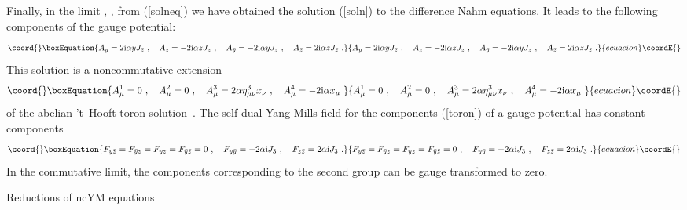 \documentclass[a4paper,11pt]{article}
\makeatletter
\renewcommand{\section}{\@startsection{section}{1}{0pt}{\medskipamount}
{\medskipamount}{\large\bf}}
\numberwithin{equation}{section}
\def\a{\alpha}
\def\b{\beta}
\def\m{\mu}
\def\n{\nu}
\providecommand{\im}{\mathrm{i}}
\providecommand{\zb}{{\bar{z}}}
\providecommand{\yb}{{\bar{y}}}
\makeatother
\begin{document}
Finally, in  the limit \myHighlight{$\b\to\infty$}\coordHE{}, \myHighlight{$\a = const$}\coordHE{}, from 
(\ref{solneq}) we have obtained the solution (\ref{soln}) to the 
difference Nahm equations. It leads to the following components of the
gauge potential: 
\begin{equation}\coord{}\boxEquation{
A_y = 2\im\a \yb  J_{\zb}\ , \quad A_z = -2\im\a \zb  J_z\ , \quad
A_{\yb} = - 2\im\a  y J_{z} \ , \quad A_\zb = 2\im \a z  J_\zb \ .
\label{anstor}
}{
A_y = 2\im\a \yb  J_{\zb}\ , \quad A_z = -2\im\a \zb  J_z\ , \quad
A_{\yb} = - 2\im\a  y J_{z} \ , \quad A_\zb = 2\im \a z  J_\zb \ .
}{ecuacion}\coordE{}\end{equation}
This solution is a noncommutative \coordHE{} extension  
\begin{equation}\coord{}\boxEquation{\label{toron}
A_\m^1=0\ ,\quad
A_\m^2=0\ , \quad
A_\m^3=2\a\eta^3_{\m\n}{x_\n}\ ,\quad A_\m^4=-2\im\a{x_\m}\ 
}{A_\m^1=0\ ,\quad
A_\m^2=0\ , \quad
A_\m^3=2\a\eta^3_{\m\n}{x_\n}\ ,\quad A_\m^4=-2\im\a{x_\m}\ 
}{ecuacion}\coordE{}\end{equation}
of the abelian 't~Hooft toron solution~\cite{'tHooft}.
The self-dual Yang-Mills field for the components (\ref{toron}) of 
a gauge potential has constant components
\begin{equation}\coord{}\boxEquation{
F_{y\zb}= F_{\yb z}=F_{yz}=F_{\yb\zb}=0\ , \quad
F_{y\yb}= - 2\a \im J_3 \ , \quad
F_{z\zb}= 2\a \im J_3\ . 
}{
F_{y\zb}= F_{\yb z}=F_{yz}=F_{\yb\zb}=0\ , \quad
F_{y\yb}= - 2\a \im J_3 \ , \quad
F_{z\zb}= 2\a \im J_3\ . 
}{ecuacion}\coordE{}\end{equation}
In the commutative limit, the components \myHighlight{$A_\m^4$}\coordHE{} corresponding to the second 
\myHighlight{$U(1)$}\coordHE{} group can be gauge transformed to zero.

\section{Reductions of ncYM equations}
\end{document}
